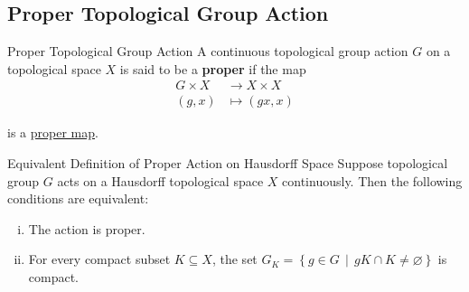 \documentclass{report}
\newcommand{\midv}{\,\middle\vert\,}
\begin{document}
\subsection{Proper Topological Group Action}

\begin{definition}{Proper Topological Group Action}{}
	A continuous topological group action $G$ on a topological space $X$ is said to be a \textbf{proper} if the map
	\begin{align*}
		G \times X &\longrightarrow X \times X\\
		(g, x) &\longmapsto(g x, x)
	\end{align*}
	
	is a \hyperref[th:proper_map]{proper map}.
\end{definition}

\begin{proposition}{Equivalent Definition of Proper Action on Hausdorff Space}{}
	Suppose topological group $G$ acts on a Hausdorff topological space $X$ continuously. Then the following conditions are equivalent:
	\begin{enumerate}[(i)]
		\item The action is proper.
		\item For every compact subset $K \subseteq X$, the set $G_K=\left\{g \in G\midv  gK\cap K\neq \varnothing\right\}$ is compact.
	\end{enumerate}
\end{proposition}
\end{document}
